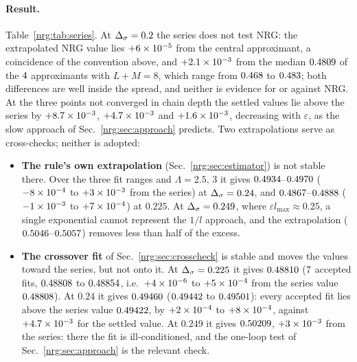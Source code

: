 \paragraph{Result.} Table~\ref{nrg:tab:series}. At $\Delta_\sigma=0.2$ the series does not test NRG: the extrapolated NRG value lies
$+6\times10^{-5}$ from the central approximant, a coincidence of the convention above, and $+2.1\times10^{-3}$ from the median
$0.4809$ of the $4$ approximants with $L+M=8$, which range from $0.468$ to
$0.483$; both differences are well inside the spread, and neither is evidence for or against NRG. At the three points not converged in chain depth the settled values lie above the series by $+8.7\times10^{-3}$,
$+4.7\times10^{-3}$ and $+1.6\times10^{-3}$, decreasing with $\varepsilon$, as the slow approach of Sec.~\ref{nrg:sec:approach} predicts.
Two extrapolations serve as cross-checks; neither is adopted:
\begin{itemize}
\item \textbf{The rule's own extrapolation} (Sec.~\ref{nrg:sec:estimator}) is not stable there. Over the three fit ranges and
  $\Lambda=2.5$, $3$ it gives $0.4934$--$0.4970$ ($-8\times10^{-4}$ to $+3\times10^{-3}$ from the series)
  at $\Delta_\sigma=0.24$, and $0.4867$--$0.4888$ ($-1\times10^{-3}$ to $+7\times10^{-4}$) at
  $0.225$. At $\Delta_\sigma=0.249$, where $\varepsilon l_{\max}\approx0.25$, a single exponential cannot represent the $1/l$ approach, and the
  extrapolation ($0.5046$--$0.5057$) removes less than half of the excess.
\item \textbf{The crossover fit} of Sec.~\ref{nrg:sec:crosscheck} is stable and moves the values toward the series, but not onto it. At
  $\Delta_\sigma=0.225$ it gives $0.48810$ ($7$ accepted fits, $0.48808$ to
  $0.48854$, i.e.\ $+4\times10^{-6}$ to $+5\times10^{-4}$ from the series value
  $0.48808$). At $0.24$ it gives $0.49460$ ($0.49442$ to $0.49501$): every accepted fit
  lies above the series value $0.49422$, by $+2\times10^{-4}$ to $+8\times10^{-4}$, against $+4.7\times10^{-3}$ for
  the settled value. At $0.249$ it gives $0.50209$, $+3\times10^{-3}$ from the series: there the fit is
  ill-conditioned, and the one-loop test of Sec.~\ref{nrg:sec:approach} is the relevant check.
\end{itemize}

